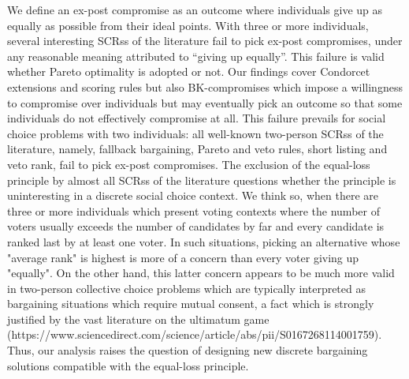 \documentclass[version=3.21, pagesize, twoside=off, bibliography=totoc, DIV=calc, fontsize=12pt, a4paper]{scrartcl}
\begin{document}
We define an ex-post compromise as an outcome where individuals give up as equally as possible from their ideal points. With three or more individuals, several interesting \acp{SCRs} of the literature fail to pick ex-post compromises, under any reasonable meaning attributed to “giving up equally”. This failure is valid whether Pareto optimality is adopted or not. Our findings cover Condorcet extensions and scoring rules but also BK-compromises which impose a willingness to compromise over individuals but may eventually pick an outcome so that some individuals do not effectively compromise at all. This failure prevails for social choice problems with two individuals: all well-known two-person \acp{SCRs} of the literature, namely, fallback bargaining, Pareto and veto rules, short listing and veto rank, fail to pick ex-post compromises. 
The exclusion of the equal-loss principle by almost all \acp{SCRs} of the literature questions whether the principle is uninteresting in a discrete social choice context. We think so, when there are three or more individuals which present voting contexts where the number of voters usually exceeds the number of candidates by far and every candidate is ranked last by at least one voter. In such situations, picking an alternative whose "average rank" is highest is more of a concern than every voter giving up "equally". On the other hand, this latter concern appears to be much more valid in two-person collective choice problems which are typically interpreted as bargaining situations which require mutual consent, a fact which is strongly justified by the vast literature on the ultimatum game (https://www.sciencedirect.com/science/article/abs/pii/S0167268114001759). Thus, our analysis raises the question of designing new discrete bargaining solutions compatible with the equal-loss principle.   



\appendix

\newcommand{\smad}{\sigma_\text{mad}}
\end{document}
